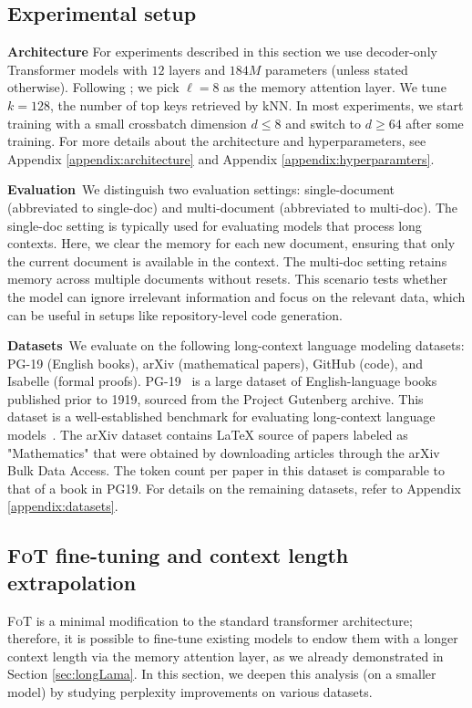 \subsection{Experimental setup}\label{sec:exp_setup}
\textbf{Architecture} For experiments described in this section we use decoder-only Transformer \citep{vaswani2017attention} models with $12$ layers and $184M$ parameters (unless stated otherwise). Following \cite{wu2022memorizing}; we pick $\ell=8$ as the memory attention layer. We tune $k=128$, the number of top keys retrieved by kNN. In most experiments, we start training with a small crossbatch dimension $d\leq 8$ and switch to $d\geq 64$ after some training. For more details about the architecture and hyperparameters, see Appendix \ref{appendix:architecture} and Appendix \ref{appendix:hyperparamters}. 

\textbf{Evaluation}~We distinguish two evaluation settings: single-document (abbreviated to single-doc) and multi-document (abbreviated to multi-doc). The single-doc setting is typically used for evaluating models that process long contexts. Here, we clear the memory for each new document, ensuring that only the current document is available in the context. The multi-doc setting retains memory across multiple documents without resets. This scenario {tests whether the model can ignore irrelevant information and focus on the relevant data, which can be useful in setups like repository-level code generation.}

\textbf{Datasets}~We evaluate on the following long-context language modeling datasets: PG-19 (English books), arXiv (mathematical papers), GitHub (code), and Isabelle (formal proofs). PG-19~\citep{raecompressive2019} is a large dataset of English-language books published prior to 1919, sourced from the Project Gutenberg archive. This dataset is a well-established benchmark for evaluating long-context language models~\citep{sun2021longrange}. The arXiv dataset contains \LaTeX{} source of papers labeled as "Mathematics" that were obtained by downloading articles through the arXiv Bulk Data Access. The token count per paper in this dataset is comparable to that of a book in PG19. For details on the remaining datasets, refer to Appendix \ref{appendix:datasets}.

\subsection{\textsc{FoT} fine-tuning and context length extrapolation}\label{sec:fft}
\textsc{FoT} is a minimal modification to the standard transformer architecture; therefore, it is possible to fine-tune existing models to endow them with a longer context length via the memory attention layer, as we already demonstrated in Section \ref{sec:longLama}. In this section, we deepen this analysis (on a smaller model) by studying perplexity improvements on various datasets.

